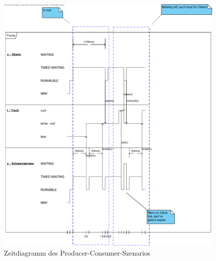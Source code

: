 \documentclass{scrartcl}
\begin{document}
\begin{figure}
   {\centering      
   \includegraphics[width=\linewidth]{Wildschwein.pdf}
   \caption{Zeitdiagramm des Producer-Consumer-Szenarios}
   \label{wildschwein}}
\end{figure}
\end{document}
